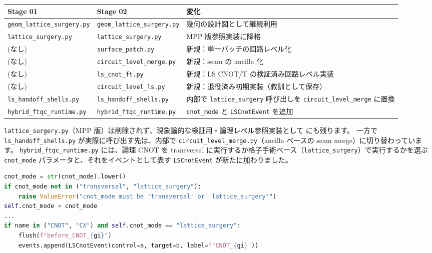 \begin{center}
\small
\begin{tabularx}{\textwidth}{>{\raggedright\arraybackslash}X>{\raggedright\arraybackslash}X>{\raggedright\arraybackslash}X}
\hline
\textbf{Stage 01} & \textbf{Stage 02} & \textbf{変化} \\
\hline
\texttt{geom\_lattice\_surgery.py} & \texttt{geom\_lattice\_surgery.py} & 幾何の設計図として継続利用 \\
\texttt{lattice\_surgery.py} & \texttt{lattice\_surgery.py} & MPP 版参照実装に降格 \\
(なし) & \texttt{surface\_patch.py} & 新規：単一パッチの回路レベル化 \\
(なし) & \texttt{circuit\_level\_merge.py} & 新規：seam の ancilla 化 \\
(なし) & \texttt{ls\_cnot\_ft.py} & 新規：LS CNOT/T の検証済み回路レベル実装 \\
(なし) & \texttt{circuit\_level\_ls.py} & 新規：退役済み初期実装（教訓として保存） \\
\texttt{ls\_handoff\_shells.py} & \texttt{ls\_handoff\_shells.py} & 内部で \texttt{lattice\_surgery} 呼び出しを \texttt{circuit\_level\_merge} に置換 \\
\texttt{hybrid\_ftqc\_runtime.py} & \texttt{hybrid\_ftqc\_runtime.py} & \texttt{cnot\_mode} と \texttt{LSCnotEvent} を追加 \\
\hline
\end{tabularx}
\end{center}

\texttt{lattice\_surgery.py}（MPP 版）は削除されず、現象論的な検証用・論理レベル参照実装として  にも残ります。
一方で \texttt{ls\_handoff\_shells.py} が実際に呼び出す先は、内部で \texttt{circuit\_level\_merge.py}（ancilla ベースの seam merge）に切り替わっています。
\texttt{hybrid\_ftqc\_runtime.py} には、論理 CNOT を transversal に実行するか格子手術ベース（\texttt{lattice\_surgery}）で実行するかを選ぶ \texttt{cnot\_mode} パラメータと、それをイベントとして表す \texttt{LSCnotEvent} が新たに加わりました。

\begin{lstlisting}[language=Python, caption={論理 CNOT の実行経路を選ぶ \texttt{cnot\_mode}（\codepath{src/stages/02_circuit_level/src/ftqc/hybrid_ftqc_runtime.py}）}]
cnot_mode = str(cnot_mode).lower()
if cnot_mode not in ("transversal", "lattice_surgery"):
    raise ValueError("cnot_mode must be 'transversal' or 'lattice_surgery'")
self.cnot_mode = cnot_mode
...
if name in ("CNOT", "CX") and self.cnot_mode == "lattice_surgery":
    flush(f"before_CNOT_{gi}")
    events.append(LSCnotEvent(control=a, target=b, label=f"CNOT_{gi}"))
\end{lstlisting}

